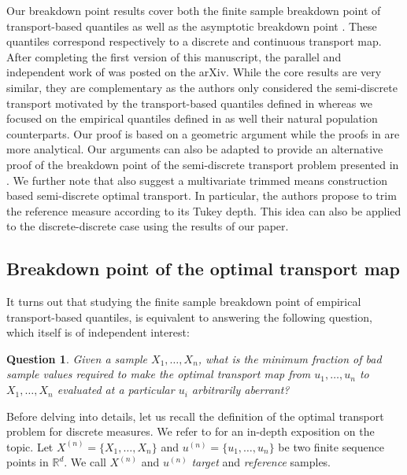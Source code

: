 \documentclass[11pt]{article}
\newcommand{\R}{\mathbb{R}}
\theoremstyle{plain}
\newtheorem{question}[sectioncount]{Question}
\theoremstyle{definition}
\begin{document}
{Our breakdown point results cover both the finite sample breakdown point of transport-based quantiles as well as the asymptotic breakdown point \cite{donoho:huber1983,hampel1971}. These quantiles correspond respectively to a discrete and continuous transport map. After completing the first version of this manuscript, the parallel and independent work of \cite{paindaveine:passeggeri2024} was posted on the arXiv. While the core results are very similar, they are complementary as the authors only considered the semi-discrete transport motivated by the transport-based quantiles  defined in \cite{GhosalSen.19}  {whereas} we focused on the empirical quantiles defined in \cite{ChernozhukovEtAl.17.AOS, HallinDelBarrioCuestaAlbertosMatran.21} as well their natural population counterparts. Our proof is based on a geometric argument while the proofs in \cite{paindaveine:passeggeri2024} are more analytical. Our arguments can also be adapted to provide an alternative proof of the breakdown point of the semi-discrete transport problem presented in \cite{paindaveine:passeggeri2024}.  }  {We further note that \cite{paindaveine:passeggeri2024} also suggest a multivariate trimmed means construction based semi-discrete optimal transport. In particular, the authors propose to trim the reference measure according to its Tukey depth. This idea can also be applied to the discrete-discrete case using the results of our paper.}



\subsection{Breakdown point of the optimal transport map}

It turns out that studying the finite sample breakdown point of empirical transport-based quantiles, is equivalent to answering the following question, which itself is of independent interest:

\begin{question}\label{question}
   {\it  Given a  sample $X_1, \dots, X_n$, what  is the minimum fraction of bad sample values required to make the optimal transport map from   $u_1, \dots, u_n$ to $X_1, \dots, X_n$ evaluated at a particular  $u_i$  arbitrarily aberrant?}
\end{question}

%
Before delving into details, let us recall the definition of the optimal transport problem for discrete measures. We refer to \cite{Villani.03} for an in-depth exposition on the topic.  Let $X^{(n)}=\{X_1, \dots, X_n\}$ and 
$u^{(n)}=\{u_1, \dots, u_n\}$ be two finite sequence points in $\R^d $. We call $X^{(n)}$ and $u^{(n)}$   {\it target} and  {\it reference} samples.
\end{document}
